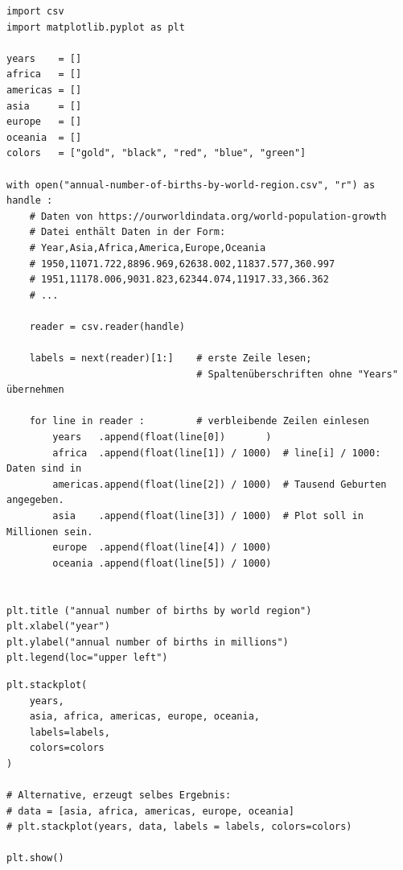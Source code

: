 \begin{codebox}
\begin{verbatim}
import csv
import matplotlib.pyplot as plt

years    = []
africa   = []
americas = []
asia     = []
europe   = []
oceania  = []
colors   = ["gold", "black", "red", "blue", "green"]

with open("annual-number-of-births-by-world-region.csv", "r") as handle :
    # Daten von https://ourworldindata.org/world-population-growth
    # Datei enthält Daten in der Form:
    # Year,Asia,Africa,America,Europe,Oceania
    # 1950,11071.722,8896.969,62638.002,11837.577,360.997
    # 1951,11178.006,9031.823,62344.074,11917.33,366.362
    # ...
      
    reader = csv.reader(handle)
    
    labels = next(reader)[1:]    # erste Zeile lesen;
                                 # Spaltenüberschriften ohne "Years" übernehmen

    for line in reader :         # verbleibende Zeilen einlesen
        years   .append(float(line[0])       )
        africa  .append(float(line[1]) / 1000)  # line[i] / 1000: Daten sind in
        americas.append(float(line[2]) / 1000)  # Tausend Geburten angegeben.
        asia    .append(float(line[3]) / 1000)  # Plot soll in Millionen sein.
        europe  .append(float(line[4]) / 1000)
        oceania .append(float(line[5]) / 1000)


plt.title ("annual number of births by world region")
plt.xlabel("year")
plt.ylabel("annual number of births in millions")
plt.legend(loc="upper left")
\end{verbatim}
\end{codebox}
%
\begin{codebox}[]
\begin{verbatim}
plt.stackplot(
    years,
    asia, africa, americas, europe, oceania,
    labels=labels,
    colors=colors
)

# Alternative, erzeugt selbes Ergebnis:
# data = [asia, africa, americas, europe, oceania]
# plt.stackplot(years, data, labels = labels, colors=colors)

plt.show()
\end{verbatim}
\end{codebox}
%
